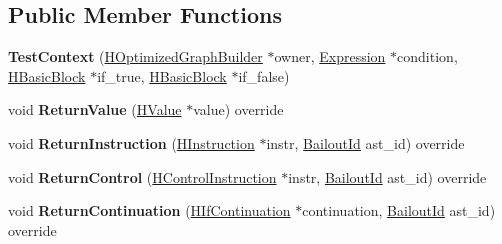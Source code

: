 \subsection*{Public Member Functions}
\begin{DoxyCompactItemize}
\item 
{\bfseries Test\+Context} (\hyperlink{classv8_1_1internal_1_1_h_optimized_graph_builder}{H\+Optimized\+Graph\+Builder} $\ast$owner, \hyperlink{classv8_1_1internal_1_1_expression}{Expression} $\ast$condition, \hyperlink{classv8_1_1internal_1_1_h_basic_block}{H\+Basic\+Block} $\ast$if\+\_\+true, \hyperlink{classv8_1_1internal_1_1_h_basic_block}{H\+Basic\+Block} $\ast$if\+\_\+false)\hypertarget{classv8_1_1internal_1_1_test_context_a874bfbba84c9a3f5a75369f7eb09fcde}{}\label{classv8_1_1internal_1_1_test_context_a874bfbba84c9a3f5a75369f7eb09fcde}

\item 
void {\bfseries Return\+Value} (\hyperlink{classv8_1_1internal_1_1_h_value}{H\+Value} $\ast$value) override\hypertarget{classv8_1_1internal_1_1_test_context_a3dda68abaa8d442cbb830ba189a20524}{}\label{classv8_1_1internal_1_1_test_context_a3dda68abaa8d442cbb830ba189a20524}

\item 
void {\bfseries Return\+Instruction} (\hyperlink{classv8_1_1internal_1_1_h_instruction}{H\+Instruction} $\ast$instr, \hyperlink{classv8_1_1internal_1_1_bailout_id}{Bailout\+Id} ast\+\_\+id) override\hypertarget{classv8_1_1internal_1_1_test_context_acc8c1a93489afa77f287618203ae3a35}{}\label{classv8_1_1internal_1_1_test_context_acc8c1a93489afa77f287618203ae3a35}

\item 
void {\bfseries Return\+Control} (\hyperlink{classv8_1_1internal_1_1_h_control_instruction}{H\+Control\+Instruction} $\ast$instr, \hyperlink{classv8_1_1internal_1_1_bailout_id}{Bailout\+Id} ast\+\_\+id) override\hypertarget{classv8_1_1internal_1_1_test_context_a55742d3b6bb1a737d06b4d378b434cca}{}\label{classv8_1_1internal_1_1_test_context_a55742d3b6bb1a737d06b4d378b434cca}

\item 
void {\bfseries Return\+Continuation} (\hyperlink{classv8_1_1internal_1_1_h_if_continuation}{H\+If\+Continuation} $\ast$continuation, \hyperlink{classv8_1_1internal_1_1_bailout_id}{Bailout\+Id} ast\+\_\+id) override\hypertarget{classv8_1_1internal_1_1_test_context_a799192c8fdef7f462786c51088d66dba}{}\label{classv8_1_1internal_1_1_test_context_a799192c8fdef7f462786c51088d66dba}


\end{DoxyCompactItemize}
